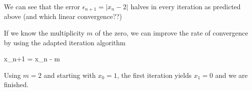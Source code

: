 \vspace*{3mm}

We can see that the error $\epsilon_{n+1} = |x_n - 2|$ halves in every iteration as predicted above (and which linear convergence??)

If we know the multiplicity $m$ of the zero, we can improve the rate of convergence by using the adapted iteration algorithm

\bee
x_{n+1} = x_n - m 
\eee

Using $m=2$ and starting with $x_0=1$, the first iteration yields $x_1 = 0$ and we are finished.





